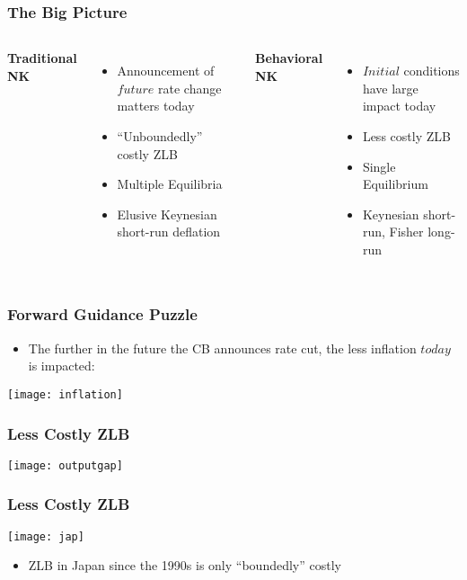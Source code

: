 \documentclass{beamer}
\begin{document}
\begin{frame}
 \frametitle{The Big Picture}

\begin{columns}[c] 

\textbf{Traditional NK}
 \begin{itemize}
 \item Announcement of $future$ rate change matters today
 \item “Unboundedly” costly ZLB
 \item Multiple Equilibria
 \item Elusive Keynesian short-run deflation
\end{itemize}

\textbf{Behavioral NK}
 \begin{itemize}
 \item $Initial$ conditions have large impact today
 \item Less costly ZLB
 \item Single Equilibrium
 \item Keynesian short-run, Fisher long-run
\end{itemize}
\end{columns}
\end{frame}


\begin{frame}
\frametitle{Forward Guidance Puzzle}
\begin{itemize}
\item The further in the future the CB announces rate cut, the less inflation $today$ is impacted:
\end{itemize}
\texttt{[image: inflation]}
\end{frame}


\begin{frame}
\frametitle{Less Costly ZLB}
\texttt{[image: outputgap]}
 \end{frame}
 

\begin{frame}
\frametitle{Less Costly ZLB}
\texttt{[image: jap]}
\begin{itemize}
\item ZLB in Japan since the 1990s is only “boundedly” costly
\end{itemize}
\end{frame}
\end{document}
